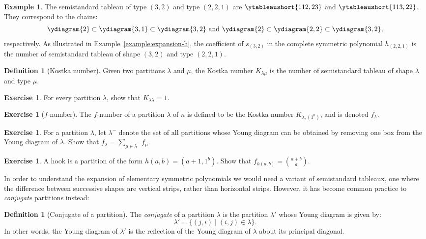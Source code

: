 \documentclass[11pt]{amsproc}
\theoremstyle{definition}
\newtheorem{definition}[theorem]{Definition}
\theoremstyle{example}
\newtheorem{example}[theorem]{Example}
\newtheorem{exercise}[theorem]{Exercise}
\begin{document}
\begin{example}
  The semistandard tableau of type $(3,2)$ and type $(2,2,1)$ are $\ytableaushort{112,23}$ and $\ytableaushort{113,22}$.
  They correspond to the chains:
  \begin{displaymath}
    \ydiagram{2}\subset \ydiagram{3,1}\subset \ydiagram{3,2} \text{ and } \ydiagram{2}\subset \ydiagram{2,2}\subset \ydiagram{3,2},
  \end{displaymath}
  respectively.
  As illustrated in Example~\ref{example:expansion-h}, the coefficient of $s_{(3,2)}$ in the complete symmetric polynomial $h_{(2,2,1)}$ is the number of semistandard tableau of shape $(3,2)$ and type $(2,2,1)$.
\end{example}
\begin{definition}
  [Kostka number]
  Given two partitions $\lambda$ and $\mu$, the Kostka number $K_{\lambda\mu}$ is the number of semistandard tableau of shape $\lambda$ and type $\mu$.
\end{definition}
\begin{exercise}
  \label{exercise:unit-kostka}
  For every partition $\lambda$, show that $K_{\lambda\lambda}=1$.
\end{exercise}
\begin{exercise}
  [$f$-number]
  The $f$-number of a partition $\lambda$ of $n$ is defined to be the Kostka number $K_{\lambda,(1^n)}$, and is denoted $f_\lambda$.
\end{exercise}
\begin{exercise}
  For a partition $\lambda$, let $\lambda^-$ denote the set of all partitions whose Young diagram can be obtained by removing one box from the Young diagram of $\lambda$.
  Show that $f_\lambda = \sum_{\mu\in \lambda^-} f_\mu$.
\end{exercise}
\begin{exercise}
  A hook is a partition of the form $h(a,b)=(a+1,1^b)$.
  Show that $f_{h(a,b)}=\binom{a+b}a$.
\end{exercise}
In order to understand the expansion of elementary symmetric polynomials we would need a variant of semistandard tableaux, one where the difference between successive shapes are vertical strips, rather than horizontal strips.
However, it has become common practice to \emph{conjugate} partitions instead:
\begin{definition}
  [Conjugate of a partition]
  The \emph{conjugate} of a partition $\lambda$ is the partition $\lambda'$ whose Young diagram is given by:
  \begin{displaymath}
    \lambda' = \{(j,i)\mid (i, j)\in \lambda\}.
  \end{displaymath}
  In other words, the Young diagram of $\lambda'$ is the reflection of the Young diagram of $\lambda$ about its principal diagonal.
\end{definition}
\end{document}
